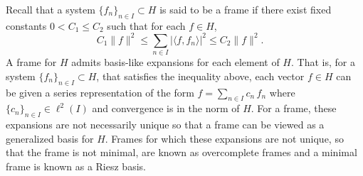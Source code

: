 \documentclass[12pt,reqno]{amsart}
\theoremstyle{definition}
\theoremstyle{definition}
\numberwithin{equation}{section}
\begin{document}
Recall that a system $\{f_n\}_{n \in I} \subset H$ is said to be a frame if there exist fixed constants $ 0 < C_{1} \leq C_{2}$ such that for each $ f \in H$,  
\begin{displaymath} C_{1} \|f\|^2 \leq \sum_{n \in I} | \langle f , f_n \rangle |^2 \leq C_{2} \|f\|^2 . \quad 
\end{displaymath}
A frame for $H$ admits basis-like expansions for each element of $H$. That is, for a system $\{f_n\}_{n \in I} \subset H $, that satisfies the inequality above, each vector $f\in H$ can be given a series representation of the form  $f = \underset{n \in I}{\sum} c_n \, f_n $
where $\{c_n\}_{n \in I} \in \ell^2(I)$ and convergence is in the norm of $H$.  For a frame, these expansions are not necessarily unique so that a frame can be viewed as a generalized basis for $H$. Frames for which these expansions are not unique, so that the frame is not minimal, are known as overcomplete frames and a minimal frame is known as a Riesz basis. 

\end{document}
